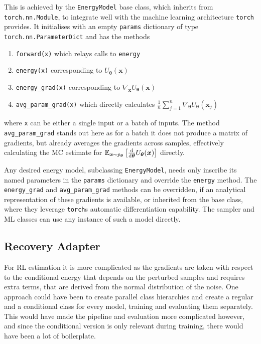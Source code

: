 This is achieved by the \texttt{EnergyModel} base class, which inherits from \texttt{torch.nn.Module}, 
to integrate well with the machine learning architecture \texttt{torch} provides.
It initialises with an empty \texttt{params} dictionary of type \texttt{torch.nn.ParameterDict} and has the methods
\begin{enumerate}
	\item \texttt{forward(x)} which relays calls to \texttt{energy}
	\item \texttt{energy(x)} corresponding to $U_{\bm{\theta}} (\bm{x})$
	\item \texttt{energy\_grad(x)} corresponding to $\nabla_{\bm{x}} U_{\bm{\theta}} (\bm{x})$
	\item \texttt{avg\_param\_grad(x)} which directly calculates $\frac{1}{n} \sum_{j=1}^n \nabla_{\bm{\theta}} U_{\bm{\theta}} (\bm{x}_j)$
\end{enumerate}

where \texttt{x} can be either a single input or a batch of inputs.
The method \texttt{avg\_param\_grad} stands out here as for a batch it does not produce a matrix of gradients, but already averages the gradients across samples,
effectively calculating the MC estimate for $\mathbb{E}_{ \bm{x} \sim p_{\bm{\theta}}} \left[ \frac{\mathop{}\!\mathrm{d}}{\mathop{}\!\mathrm{d} \bm{\theta}} U_{\bm{\theta}} (\bm{x}) \right]$ directly.

Any desired energy model, subclassing \texttt{EnergyModel}, needs only inscribe its named parameters in the \texttt{params} dictionary and override the \texttt{energy} method.
The \texttt{energy\_grad} and \texttt{avg\_param\_grad} methods can be overridden, if an analytical representation of these gradients is available, 
or inherited from the base class, where they leverage \texttt{torch}s automatic differentiation capability.
The sampler and ML classes can use any instance of such a model directly. 


\subsection{Recovery Adapter}

For RL estimation it is more complicated as the gradients are taken with respect to the conditional energy that depends on the perturbed samples 
and requires extra terms, that are derived from the normal distribution of the noise.
One approach could have been to create parallel class hierarchies and create a regular and a conditional class for every model, training and evaluating them separately.
This would have made the pipeline and evaluation more complicated however, and since the conditional version is only relevant during training, 
there would have been a lot of boilerplate.

